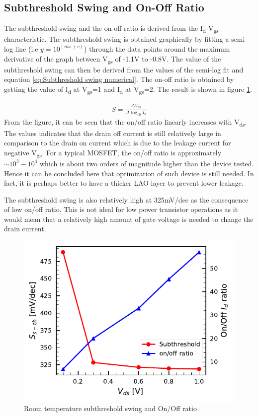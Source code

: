 \documentclass[11pt,a4paper]{report}
\begin{document}
\subsection{Subthreshold Swing and On-Off Ratio} \label{sec:Sth-On/off RoomT}
The subthreshold swing and the on-off ratio is derived from the I\textsubscript{d}-V\textsubscript{gs} characteristic. The subthreshold swing is obtained graphically by fitting a semi-log line (i.e $y = 10^{(mx+c)}$) through the data points around the maximum derivative of the graph between V\textsubscript{gs} of -1.1V to -0.8V. The value of the subthreshold swing can then be derived from the values of the semi-log fit and equation \ref{eq:Subthreshold swing numerical}. The on-off ratio is obtained by getting the value of I\textsubscript{d} at V\textsubscript{gs}=1 and I\textsubscript{d} at V\textsubscript{gs}=2. The result is shown in figure \ref{fig:Subth-OnOff-RoomTemp}. 

\begin{align}\label{eq:Subthreshold swing numerical}
    S = \frac{\Delta V_{gs}}{\Delta \log_{10}I_d}
\end{align}
From the figure, it can be seen that the on/off ratio linearly increases with V\textsubscript{ds}. The values indicates that the drain off current is still relatively large in comparison to the drain on current which is due to the leakage current for negative V\textsubscript{gs}. For a typical MOSFET, the on/off ratio is approximately $\sim 10^3-10^4$\cite{hu_2010} which is about two orders of magnitude higher than the device tested. Hence it can be concluded here that optimization of such device is still needed. In fact, it is perhaps better to have a thicker LAO layer to prevent lower leakage.

The subthreshold swing is also relatively high at 325mV/dec as the consequence of low on/off ratio. This is not ideal for low power transistor operations as it would mean that a relatively high amount of gate voltage is needed to change the drain current. 

\begin{figure}[!h]
    \centering
    \includegraphics[scale=1]{Figures/Batch2/Dev16_batch2_Subth-on-off.pdf}
    \caption{Room temperature subthreshold swing and On/Off ratio}
    \label{fig:Subth-OnOff-RoomTemp}
\end{figure}
\end{document}
